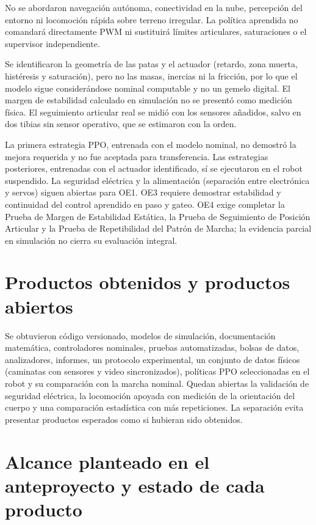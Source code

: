 No se abordaron navegación autónoma, conectividad en la nube, percepción del
entorno ni locomoción rápida sobre terreno irregular. La política aprendida no
comandará directamente PWM ni sustituirá límites articulares, saturaciones o el
supervisor independiente.

Se identificaron la geometría de las patas y el actuador (retardo, zona
muerta, histéresis y saturación), pero no las masas, inercias ni la fricción, por
lo que el modelo sigue considerándose nominal computable y no un gemelo
digital. El margen de estabilidad calculado en simulación no se presentó como
medición física. El seguimiento articular real se midió con los sensores
añadidos, salvo en dos tibias sin sensor operativo, que se estimaron con la
orden.

La primera estrategia PPO, entrenada con el modelo nominal, no demostró la
mejora requerida y no fue aceptada para transferencia. Las estrategias
posteriores, entrenadas con el actuador identificado, sí se ejecutaron en el
robot suspendido. La seguridad eléctrica y la alimentación (separación entre
electrónica y servos) siguen abiertas para OE1. OE3 requiere demostrar estabilidad y continuidad del control aprendido
en paso y gateo. OE4 exige completar la Prueba de Margen de Estabilidad Estática,
la Prueba de Seguimiento de Posición Articular y la Prueba de Repetibilidad del
Patrón de Marcha; la evidencia parcial en simulación no cierra su evaluación integral.

\section{Productos obtenidos y productos abiertos}

Se obtuvieron código versionado, modelos de simulación, documentación
matemática, controladores nominales, pruebas automatizadas, bolsas de datos,
analizadores, informes, un protocolo experimental, un conjunto de datos físicos
(caminatas con sensores y video sincronizados), políticas PPO seleccionadas en
el robot y su comparación con la marcha nominal. Quedan abiertas la validación
de seguridad eléctrica, la locomoción apoyada con medición de la orientación
del cuerpo y una comparación estadística con más repeticiones. La separación evita presentar productos esperados como si
hubieran sido obtenidos.

\section{Alcance planteado en el anteproyecto y estado de cada producto}

